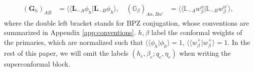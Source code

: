 \documentclass[12pt]{article}
\def\ie{\begin{equation}\begin{aligned}}
\def\fe{\end{aligned}\end{equation}}
\begin{document}
\ie
(\mathbf{G}_h)_{AB}&=\langle\langle \mathbf{L}_{-A}\phi_h|\mathbf{L}_{-B}\phi_h\rangle,\quad (\mathbb{G}_\beta)_{A\alpha, B\alpha'}&=\langle\langle \mathbb{L}_{-A}w_\beta^\alpha|\mathbb{L}_{-B}w_\beta^{\alpha'}\rangle,
\fe
where the double left bracket stands for BPZ conjugation, whose conventions are summarized in Appendix \ref{app:conventions}. $h, \beta$ label the conformal weights of the primaries, which are normalized such that $\langle\langle \phi_h|\phi_h\rangle =1$, $\langle\langle w_\beta^+|w_\beta^{+} \rangle=1$. In the rest of this paper, we will omit the labels $(h_e, \beta_e;q_e, \eta_e)$ when writing the superconformal block. 

\end{document}
